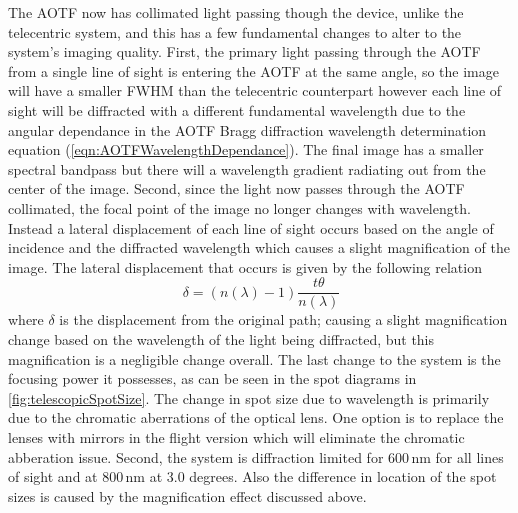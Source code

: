 The AOTF now has collimated light passing though the device, unlike the telecentric system, and this has a few fundamental changes to alter to the system's imaging quality. First, the primary light passing through the AOTF from a single line of sight is entering the AOTF at the same angle, so the image will have a smaller FWHM than the telecentric counterpart however each line of sight will be diffracted with a different fundamental wavelength due to the angular dependance in the AOTF Bragg diffraction wavelength determination equation (\autoref{eqn:AOTFWavelengthDependance}). The final image has a smaller spectral bandpass but there will a wavelength gradient radiating out from the center of the image. Second, since the light now passes through the AOTF collimated, the focal point of the image no longer changes with wavelength. Instead a lateral displacement of each line of sight occurs based on the angle of incidence and the diffracted wavelength which causes a slight magnification of the image. The lateral displacement that occurs is given by the following relation
\begin{equation}
    \ \delta = (n(\lambda)-1)\frac{t\theta}{n(\lambda)}
    \label{eqn:diplacementPlaneParallel}
\end{equation}
where $\delta$ is the displacement from the original path; causing a slight magnification change based on the wavelength of the light being diffracted, but this magnification is a negligible change overall. The last change to the system is the focusing power it possesses, as can be seen in the spot diagrams in \autoref{fig:telescopicSpotSize}. The change in spot size due to wavelength is primarily due to the chromatic aberrations of the optical lens. One option is to replace the lenses with mirrors in the flight version which will eliminate the chromatic abberation issue. Second, the system is diffraction limited for 600\,nm for all lines of sight and at 800\,nm at 3.0 degrees. Also the difference in location of the spot sizes is caused by the magnification effect discussed above.


